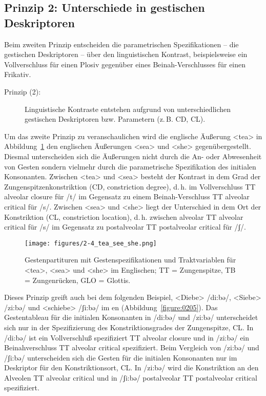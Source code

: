 \subsection{Prinzip 2: Unterschiede in gestischen Deskriptoren}
\label{subsec:020102}

Beim zweiten Prinzip entscheiden die parametrischen Spezifikationen -- die gestischen Deskriptoren -- über den linguistischen Kontrast, beispielsweise ein Vollverschluss für einen Plosiv gegenüber eines Beinah-Verschlusses für einen Frikativ.

\begin{description}
	\item[Prinzip (2):] Linguistische Kontraste entstehen aufgrund von unterschiedlichen gestischen Deskriptoren bzw. Parametern (z.\,B. CD, CL).
\end{description}

Um das zweite Prinzip zu veranschaulichen wird die englische Äußerung <tea> in Abbildung~\ref{figure:0204} den englischen Äußerungen <sea> und <she> gegenübergestellt. Diesmal unterscheiden sich die Äußerungen nicht durch die An- oder Abwesenheit von Gesten sondern vielmehr durch die parametrische Spezifikation des initialen Konsonanten. Zwischen <tea> und <sea> besteht der Kontrast in dem Grad der Zungenspitzenkonstriktion (CD, constriction degree), d.\,h. im Vollverschluss {TT alveolar closure} für /t/ im Gegensatz zu einem Beinah-Verschluss {TT alveolar critical} für /s/. Zwischen <sea> und <she> liegt der Unterschied in dem Ort der Konstriktion (CL, constriction location), d.\,h. zwischen alveolar {TT alveolar critical} für /s/ im Gegensatz zu postalveolar {TT postalveolar critical} für /ʃ/.



\begin{figure}[t]
	\texttt{[image: figures/2-4\_tea\_see\_she.png]}
	\caption{Gestenpartituren mit Gestenspezifikationen und Traktvariablen für <tea>, <sea> und <she> im Englischen; TT = Zungenspitze, TB = Zungenrücken, GLO = Glottis. 
	}
	\label{figure:0204}
\end{figure}


Dieses Prinzip greift auch bei dem folgenden Beispiel, <Diebe> /di:bə/, <Siebe> /zi:bə/ und <schiebe> /ʃi:bə/ im en (Abbildung~\ref{figure:0205}). Das Gestentableau für die initialen Konsonanten in /di:bə/ und /zi:bə/ unterscheidet sich nur in der Spezifizierung des Konstriktionsgrades der Zungenspitze, CL. In /di:bə/ ist ein Vollverschluß spezifiziert {TT alveolar closure} und in /zi:bə/ ein Beinahverschluss {TT alveolar critical} spezifiziert. Beim Vergleich von /zi:bə/ und /ʃi:bə/ unterscheiden sich die Gesten für die initialen Konsonanten nur im Deskriptor für den Konstriktionsort, CL. In /zi:bə/ wird die Konstriktion an den Alveolen {TT alveolar critical} und in /ʃi:bə/ postalveolar {TT postalveolar critical} spezifiziert.


